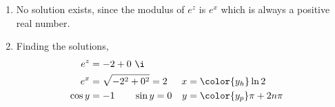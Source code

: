 \begin{enumerate}
    \item No solution exists, since the modulus of $ e^z $ is $ e^x $ which is always
          a positive real number.

    \item Finding the solutions,
          \begin{align}
              e^z    & = -2 + 0\ \i                \\
              e^x    & = \sqrt{-2^2 + 0^2} = 2   &
              x      & = \color{y_h}  \ln 2        \\
              \cos y & = -1 \qquad \sin y = 0    &
              y      & = \color{y_p} \pi + 2n\pi
          \end{align}
\end{enumerate}